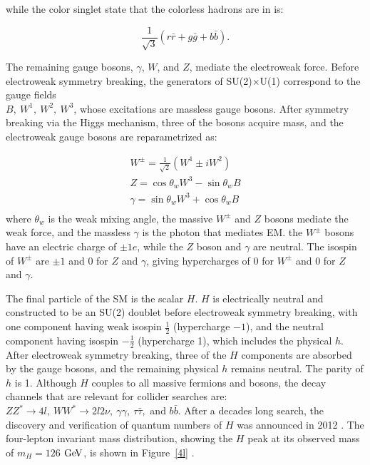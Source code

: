 while the color singlet state that the colorless hadrons are in is:

\begin{equation}
\frac{1}{\sqrt{3}}(r\bar{r} + g\bar{g} + b\bar{b}).
\end{equation}

\indent The remaining gauge bosons, $\gamma$, $W$, and $Z$, mediate the electroweak force. Before electroweak symmetry breaking, the generators of SU(2)$\times$U(1) correspond to the gauge fields \\
$B,\  W^1,\  W^2,\  W^3$, whose excitations are massless gauge bosons. After symmetry breaking via the Higgs mechanism, three of the bosons acquire mass, and the electroweak gauge bosons are reparametrized as:

\begin{equation}
\begin{split}
W^\pm = \frac{1}{\sqrt{2}}(W^1 \pm iW^2) \\
Z = \cos\theta_w W^3 - \sin\theta_w B \\
\gamma = \sin\theta_w W^3 + \cos\theta_w B \\
\end{split}
\end{equation}
where $\theta_w$ is the weak mixing angle, the massive $W^\pm$ and $Z$ bosons mediate the weak force, and the massless $\gamma$ is the photon that mediates EM. the $W^\pm$ bosons have an electric charge of $\pm 1e$, while the $Z$ boson and $\gamma$ are neutral. The isospin of $W^\pm$ are $\pm1$ and 0 for $Z$ and $\gamma$, giving hypercharges of $0$ for $W^\pm$ and 0 for $Z$ and $\gamma$. 

\indent The final particle of the SM is the scalar $H$. $H$ is electrically neutral and constructed to be an SU(2) doublet before electroweak symmetry breaking, with one component having weak isospin $\frac{1}{2}$ (hypercharge $-1$), and the neutral component having isospin $-\frac{1}{2}$ (hypercharge 1), which includes the physical $h$. After electroweak symmetry breaking, three of the $H$ components are absorbed by the gauge bosons, and the remaining physical $h$ remains neutral. The parity of $h$ is 1. Although $H$ couples to all massive fermions and bosons, the decay channels that are relevant for collider searches are: $ZZ^* \rightarrow 4l,\  WW^* \rightarrow 2l2\nu,\  \gamma\gamma,\  \tau\bar{\tau},$ and $b\bar{b}$. After a decades long search, the discovery and verification of quantum numbers of $H$ was announced in 2012 \cite{Chatrchyan:2012xdj, Aad:2012tfa}. The four-lepton invariant mass distribution, showing the $H$ peak at its observed mass of $m_H = 126$ $\mathrm{Ge\kern -0.1em V}$, is shown in Figure~\ref{4l} \cite{CMS:HZZ}.

